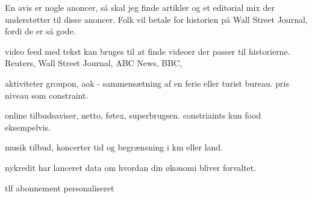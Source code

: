 En avis er nogle anoncer, så skal jeg finde artikler og et editorial mix der understøtter til disse anoncer.
Folk vil betale for historien på Wall Street Journal, fordi de er så gode.

video feed med tekst kan bruges til at finde videoer der passer til historierne. Reuters, Wall Street Journal, ABC News, BBC, 

aktiviteter groupon, aok - sammensætning af en ferie eller turist bureau. pris niveau som constraint.

online tilbudsaviser, netto, føtex, superbrugsen. constriaints kun food eksempelvis.

musik tilbud, koncerter tid og begrænsning i km eller land.

nykredit har lanceret data om hvordan din økonomi bliver forvaltet.

tlf abonnement personaliseret


